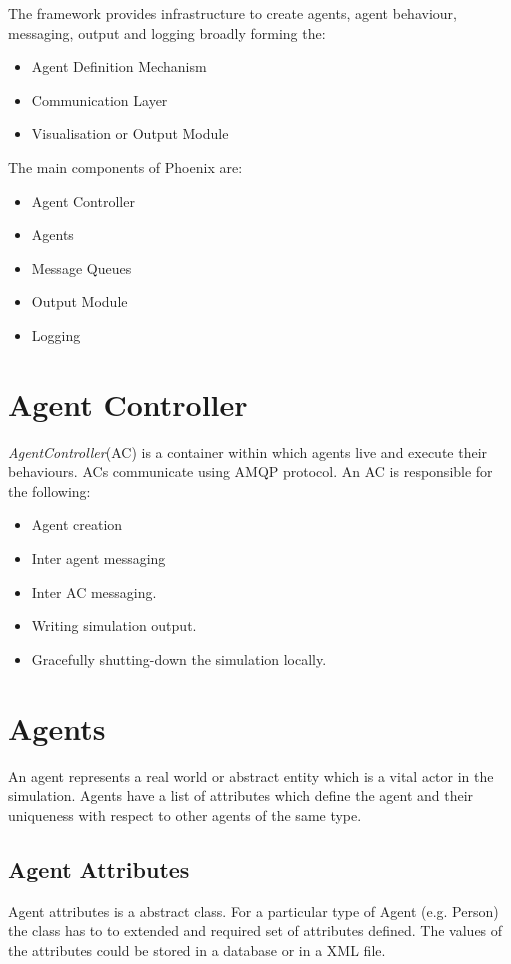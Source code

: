 The framework provides infrastructure to create agents, agent
behaviour, messaging, output and logging broadly forming the:

\begin{itemize}
\item Agent Definition Mechanism
\item Communication Layer
\item Visualisation or Output Module
\end{itemize}

The main components of Phoenix are:
\begin{itemize}
\item Agent Controller
\item Agents
\item Message Queues
\item Output Module
\item Logging
\end{itemize}

\section{Agent Controller}
\textit{AgentController}(AC) is a container within which agents live
and execute their behaviours. ACs communicate using AMQP protocol. An
AC is responsible for the following:

\begin{itemize}
\item Agent creation
\item Inter agent messaging
\item Inter AC messaging.
\item Writing simulation output.
\item Gracefully shutting-down the simulation locally. 
\end{itemize}

\section{Agents}
An agent represents a real world or abstract entity which is a vital
actor in the simulation. Agents have a list of attributes which define
the agent and their uniqueness with respect to other agents of the
same type.

\subsection{ Agent Attributes }
Agent attributes is a abstract class. For a particular type of Agent
(e.g. Person) the class has to to extended and required set of
attributes defined. The values of the attributes could be stored in a
database or in a XML file.

